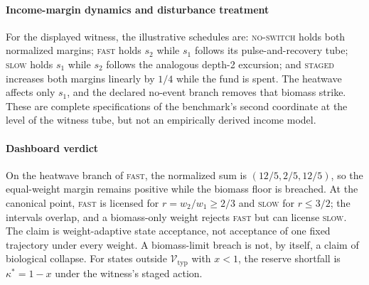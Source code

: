\documentclass[preprint,11pt,authoryear]{elsarticle}
\theoremstyle{remark}
\newcommand{\Vtyp}{\mathcal{V}_{\mathrm{typ}}}
\newcommand{\act}[1]{\textsc{#1}}
\begin{document}
\paragraph{Income-margin dynamics and disturbance treatment} For the displayed witness, the illustrative schedules are: \act{no-switch} holds both normalized margins; \act{fast} holds $s_2$ while $s_1$ follows its pulse-and-recovery tube; \act{slow} holds $s_1$ while $s_2$ follows the analogous depth-2 excursion; and \act{staged} increases both margins linearly by $1/4$ while the fund is spent. The heatwave affects only $s_1$, and the declared no-event branch removes that biomass strike. These are complete specifications of the benchmark's second coordinate at the level of the witness tube, but not an empirically derived income model.

\paragraph{Dashboard verdict} On the heatwave branch of \act{fast}, the normalized sum is $(12/5,2/5,12/5)$, so the equal-weight margin remains positive while the biomass floor is breached. At the canonical point, \act{fast} is licensed for $r=w_2/w_1\ge2/3$ and \act{slow} for $r\le3/2$; the intervals overlap, and a biomass-only weight rejects \act{fast} but can license \act{slow}. The claim is weight-adaptive state acceptance, not acceptance of one fixed trajectory under every weight. A biomass-limit breach is not, by itself, a claim of biological collapse. For states outside $\Vtyp$ with $x<1$, the reserve shortfall is $\kappa^*=1-x$ under the witness's staged action.
\end{document}
